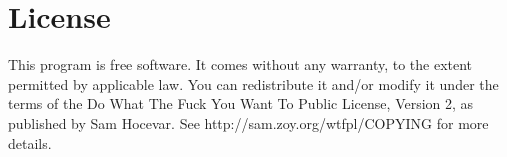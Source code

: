 \documentclass[a4paper]{article}
\begin{document}
\section{License}

This program is free software. It comes without any warranty, to the extent
permitted by applicable law. You can redistribute it and/or modify it under
the terms of the Do What The Fuck You Want To Public License, Version 2, as
published by Sam Hocevar. See http://sam.zoy.org/wtfpl/COPYING for more
details.
\end{document}

